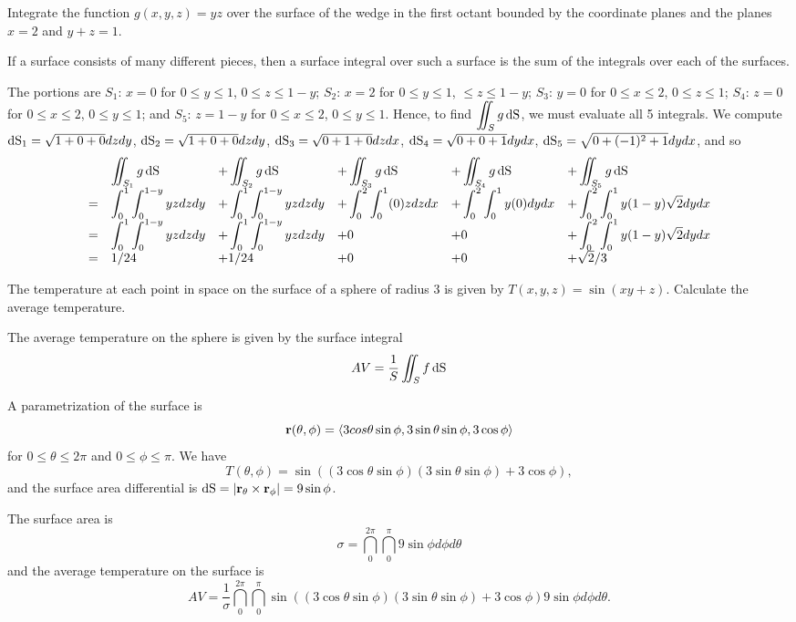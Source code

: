 \begin{exa}
Integrate the function
$g(x,y,z)=yz$ over the surface of the wedge in the first octant
bounded by the coordinate planes and the planes $x=2$ and $y+z=1$.
\end{exa}

\begin{solu}
If a surface consists of many different pieces,
then a surface integral over such a surface is the sum of the
integrals over each of the surfaces.

The portions are $S_1$: $x=0$ for
$0\leq y\leq 1$, $0\leq z\leq 1-y$;  $S_2$: $x=2$ for $0\leq y\leq 1$, $\leq z\leq 1-y$;
$S_3$: $y=0$ for $0\leq x\leq 2$, $0\leq z\leq 1$; $S_4$: $z=0$ for $0\leq x\leq 2$, $0\leq y\leq 1$; and
$S_5$: $z=1-y$ for $0\leq x\leq 2$, $0\leq y\leq 1$. Hence, to find $\diint_S g\d \S$, we
must evaluate all 5 integrals.  We compute $\d \S_1 = \sqrt{1+0+0}dzdy$,
$\d \S_2=\sqrt{1+0+0}dzdy$, $\d \S_3=\sqrt{0+1+0}dzdx$, $\d \S_4=\sqrt{0+0+1}dydx$, $\d \S_5=\sqrt{0+(-1)^2+1}dydx$, and so
$$\begin{array}{llllll}
&\diint_{S_1} g\d \S&+\diint_{S_2} g\d \S&+\diint_{S_3} g\d \S&+\diint_{S_4} g
\d \S&+\diint_{S_5} g\d \S\\
=&\dint_0^1\dint_{0}^{1-y} yz dzdy&+\dint_0^1\dint_{0}^{1-y} yz dzdy&+\dint_0^2\dint_{0}^{1}
(0)z dzdx&+\dint_0^2\dint_{0}^{1} y(0) dydx&+\dint_0^2\dint_{0}^{1} y(1-y)
\sqrt{2}dydx\\
=&\dint_0^1\dint_{0}^{1-y} yz dzdy&+\dint_0^1\dint_{0}^{1-y} yz
dzdy&+0&+0&+\dint_0^2\dint_{0}^{1} y(1-y) \sqrt{2}dydx\\
=&1/24&+1/24&+0&+0&+\sqrt{2}/3
\end{array}$$
\end{solu}




\begin{exa}

  The temperature at each point in space on the surface of a sphere of
  radius 3 is given by {$T(x,y,z) = \sin(xy+z)$}. Calculate the average temperature.
\end{exa}

\begin{solu}

  The average
  temperature on the sphere is given by the surface integral
  \[AV =
  \frac{1}{S}\diint_\superficie f\d \S\]

 A parametrization of the surface
  is
  \[\mathbf{ r} (\theta,\phi) =
    \langle3cos\theta\sin\phi,3\sin\theta\sin\phi,3\cos\phi\rangle\]
  for {$0\leq \theta\leq 2\pi$} and {$0\leq \phi\leq \pi$}. We have
  \[T(\theta,\phi) =
    \sin((3\cos\theta\sin\phi)(3\sin\theta\sin\phi)+3\cos\phi),\] and
  the surface area differential is {$\d \S = |\vector{r}_\theta\times\vector{r}_\phi| = 9\sin \phi$}.

    The surface area is
  \[\sigma = \dint_{0}^{2\pi} \dint_{0}^{\pi} 9\sin \phi d\phi d\theta\]
  and the average temperature on the surface is
  \[AV =\frac{1}{\sigma}
  \dint_{0}^{2\pi} \dint_{0}^{\pi}
  \sin((3\cos\theta\sin\phi)(3\sin\theta\sin\phi)+3\cos\phi) 9\sin
  \phi d\phi d\theta .\]

\end{solu}

